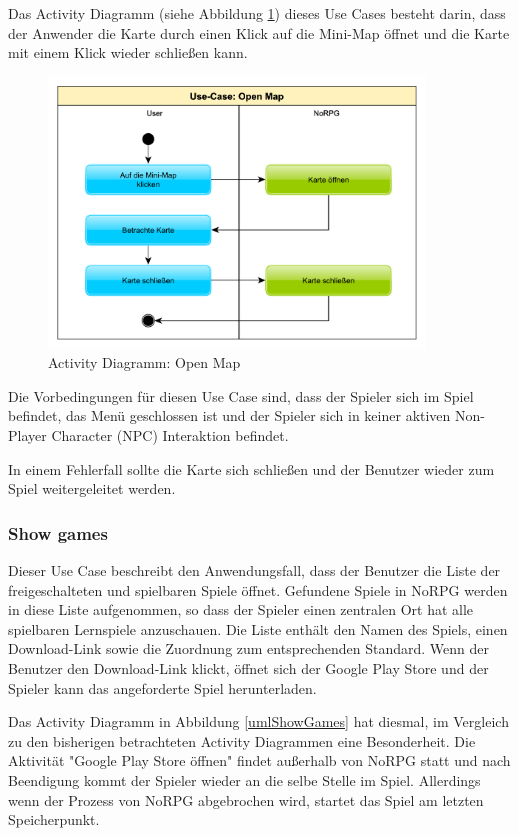 			Das Activity Diagramm (siehe Abbildung \ref{umlOpenMap}) dieses Use Cases besteht darin, dass der Anwender die Karte durch einen Klick auf die Mini-Map öffnet und die Karte mit einem Klick wieder schließen kann. 
			\begin{figure}[htbp]
				\centering 
				\label{umlOpenMap}
				\includegraphics[width=10cm]{pics/OpenMap.pdf}
				\caption{Activity Diagramm: Open Map}
			\end{figure}
			
			Die Vorbedingungen für diesen Use Case sind, dass der Spieler sich im Spiel befindet, das Menü geschlossen ist und der Spieler sich in keiner aktiven Non-Player Character (NPC) Interaktion befindet.
			
			In einem Fehlerfall sollte die Karte sich schließen und der Benutzer wieder zum Spiel weitergeleitet werden.
	
		\subsubsection{Show games}
			Dieser Use Case beschreibt den Anwendungsfall, dass der Benutzer die Liste der freigeschalteten und spielbaren Spiele öffnet. Gefundene Spiele in NoRPG werden in diese Liste aufgenommen, so dass der Spieler einen zentralen Ort hat alle spielbaren Lernspiele anzuschauen. Die Liste enthält den Namen des Spiels, einen Download-Link sowie die Zuordnung zum entsprechenden Standard. Wenn der Benutzer den Download-Link klickt, öffnet sich der Google Play Store und der Spieler kann das angeforderte Spiel herunterladen.
			
			Das Activity Diagramm in Abbildung \ref{umlShowGames} hat diesmal, im Vergleich zu den bisherigen betrachteten Activity Diagrammen eine Besonderheit. Die Aktivität "Google Play Store öffnen" findet außerhalb von NoRPG statt und nach Beendigung kommt der Spieler wieder an die selbe Stelle im Spiel. Allerdings wenn der Prozess von NoRPG abgebrochen wird, startet das Spiel am letzten Speicherpunkt.
			
